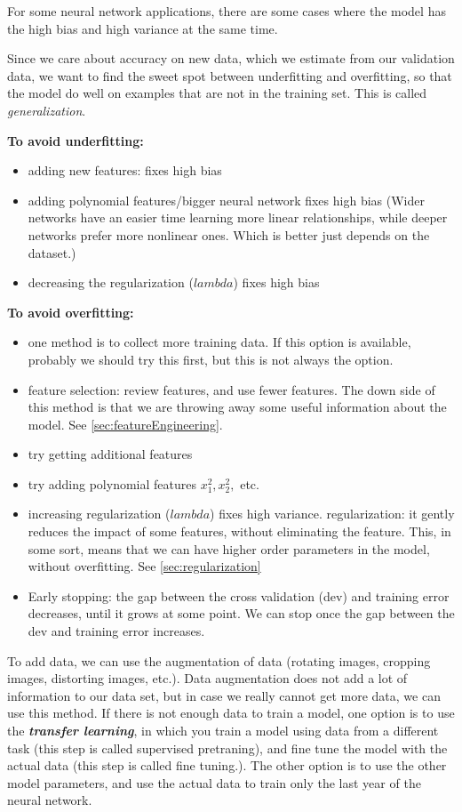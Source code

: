 \documentclass[12pt]{report}
\begin{document}
For some neural network applications, there are some cases where the model has the high bias and high variance at the same time.


Since we care about accuracy on new data, which we estimate from our validation data, we want to find the sweet spot between underfitting and overfitting, so that the model do well on examples that are not in the training set. This is called \textit{generalization}.

\textbf{To avoid underfitting:}
\begin{itemize}
\item adding new features: fixes high bias
\item adding polynomial features/bigger neural network fixes high bias (Wider networks have an easier time learning more linear relationships, while deeper networks prefer more nonlinear ones. Which is better just depends on the dataset.)
\item decreasing the regularization ($lambda$) fixes high bias
\end{itemize}

\textbf{To avoid overfitting:}
\begin{itemize}
\item one method is to collect more training data. If this option is available, probably we should try this first, but this is not always the option.
\item feature selection: review features, and use fewer features. The down side of this method is that we are throwing away some useful information about the model. See \ref{sec:featureEngineering}.
\item try getting additional features
\item try adding polynomial features $x_1^2, x_2^2, $ etc.
\item increasing regularization ($lambda$) fixes high variance. regularization: it gently reduces the impact of some features, without eliminating the feature. This, in some sort, means that we can have higher order parameters in the model, without overfitting. See \ref{sec:regularization}
\item Early stopping: the gap between the cross validation (dev) and training error decreases, until it grows at some point. We can stop once the gap between the dev and training error increases.
\end{itemize}


To add data, we can use the augmentation of data (rotating images, cropping images, distorting images, etc.). Data augmentation does not add a lot of information to our data set, but in case we really cannot get more data, we can use this method.  If there is not enough data to train a model, one option is to use the \textbf{\textit{transfer learning}}, in which you train a model using data from a different task (this step is called supervised pretraning), and fine tune the model with the actual data (this step is called fine tuning.). The other option is to use the other model parameters, and use the actual data to train only the last year of the neural network.
\end{document}
